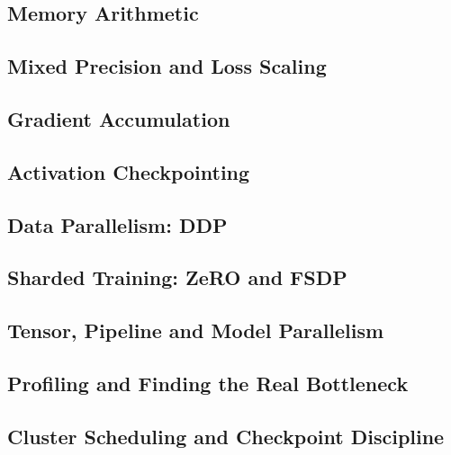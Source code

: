 
\subsection{Memory Arithmetic}


\subsection{Mixed Precision and Loss Scaling}


\subsection{Gradient Accumulation}

\subsection{Activation Checkpointing}

\subsection{Data Parallelism: DDP}

\subsection{Sharded Training: ZeRO and FSDP}

\subsection{Tensor, Pipeline and Model Parallelism}

\subsection{Profiling and Finding the Real Bottleneck}

\subsection{Cluster Scheduling and Checkpoint Discipline}

